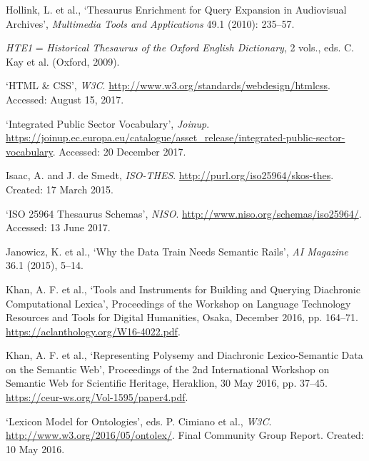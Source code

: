 \begin{list}{}
\item %
Hollink, L. et al., `Thesaurus Enrichment for Query Expansion in Audiovisual Archives', \textit{Multimedia Tools and Applications} 49.1 (2010): 235–57.

\textit{HTE1} = \textit{Historical Thesaurus of the Oxford English Dictionary}, 2 vols., eds. C. Kay et al. (Oxford, 2009).

\item %
`HTML \& CSS', \textit{W3C}. \url{http://www.w3.org/standards/webdesign/htmlcss}. Accessed: August 15, 2017.

\item %
`Integrated Public Sector Vocabulary', \textit{Joinup}. 
\url{https://joinup.ec.europa.eu/catalogue/asset_release/integrated-public-sector-vocabulary}. Accessed: 20 December 2017.

\item %
Isaac, A. and J. de Smedt, \textit{ISO-THES}. \url{http://purl.org/iso25964/skos-thes}. Created: 17 March 2015.

\item %
`ISO 25964 Thesaurus Schemas', \textit{NISO}. \url{http://www.niso.org/schemas/iso25964/}. Accessed: 13 June 2017.

\item %
Janowicz, K. et al., `Why the Data Train Needs Semantic Rails', \textit{AI Magazine} 36.1 (2015), 5–14.

\item %
Khan, A. F. et al., `Tools and Instruments for Building and Querying Diachronic Computational Lexica', Proceedings of the Workshop on Language Technology Resources and Tools for Digital Humanities, Osaka, December 2016, pp. 164–71. \url{https://aclanthology.org/W16-4022.pdf}.


\item %
Khan, A. F. et al., `Representing Polysemy and Diachronic Lexico-Semantic Data on the Semantic Web', Proceedings of the 2nd International Workshop on Semantic Web for Scientific Heritage, Heraklion, 30 May 2016, pp. 37–45. \url{https://ceur-ws.org/Vol-1595/paper4.pdf}.

\item %
`Lexicon Model for Ontologies', eds. P. Cimiano et al., \textit{W3C}. \url{http://www.w3.org/2016/05/ontolex/}. Final Community Group Report. Created: 10 May 2016.


\end{list}
